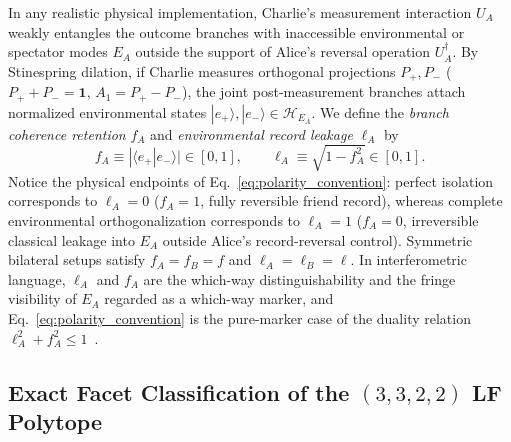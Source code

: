 In any realistic physical implementation, Charlie's measurement interaction $U_A$ weakly entangles the outcome branches with inaccessible environmental or spectator modes $E_A$ outside the support of Alice's reversal operation $U_A^\dagger$. By Stinespring dilation, if Charlie measures orthogonal projections $P_+, P_-$ ($P_+ + P_- = \mathbf{1}$, $A_1 = P_+ - P_-$), the joint post-measurement branches attach normalized environmental states $|e_+\rangle, |e_-\rangle \in \mathcal{H}_{E_A}$. We define the \emph{branch coherence retention} $f_A$ and \emph{environmental record leakage} $\ell_A$ by
\begin{equation}
    f_A \equiv |\langle e_+ | e_- \rangle| \in [0, 1], \qquad \ell_A \equiv \sqrt{1 - f_A^2} \in [0, 1].
    \label{eq:polarity_convention}
\end{equation}
Notice the physical endpoints of Eq.~\eqref{eq:polarity_convention}: perfect isolation corresponds to $\ell_A = 0$ ($f_A = 1$, fully reversible friend record), whereas complete environmental orthogonalization corresponds to $\ell_A = 1$ ($f_A = 0$, irreversible classical leakage into $E_A$ outside Alice's record-reversal control). Symmetric bilateral setups satisfy $f_A = f_B = f$ and $\ell_A = \ell_B = \ell$. In interferometric language, $\ell_A$ and $f_A$ are the which-way distinguishability and the fringe visibility of $E_A$ regarded as a which-way marker, and Eq.~\eqref{eq:polarity_convention} is the pure-marker case of the duality relation $\ell_A^2 + f_A^2 \le 1$~\cite{englert1996}.

\subsection{Exact Facet Classification of the $(3,3,2,2)$ LF Polytope}

